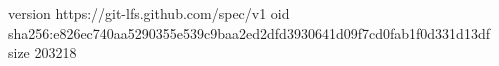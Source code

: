 version https://git-lfs.github.com/spec/v1
oid sha256:e826ec740aa5290355e539c9baa2ed2dfd3930641d09f7cd0fab1f0d331d13df
size 203218

